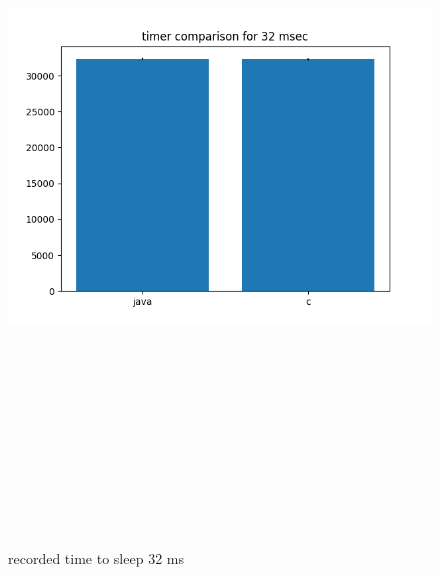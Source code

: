 \documentclass{article}
\begin{document}
    \begin{figure}[H]
    	\centering
    	\includegraphics[width=17cm,height=20cm,keepaspectratio]{AsyncMonitorCompares/sleep-timer_java-vs-c/time-compare-32.png}
    	\caption{recorded time to sleep 32 ms}
    	\label{fig:xalan-fix-PKG}
    \end{figure}
\end{document}

